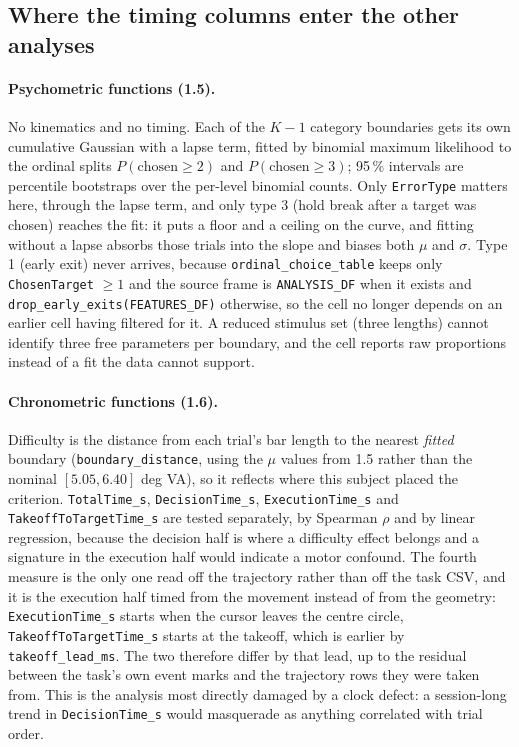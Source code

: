 \documentclass[11pt,a4paper]{article}
\newcommand{\code}[1]{\texttt{\small #1}}
\begin{document}
\subsection{Where the timing columns enter the other analyses}
\label{sec:timingcols}

\paragraph{Psychometric functions (1.5).} No kinematics and no timing. Each of
the $K-1$ category boundaries gets its own cumulative Gaussian with a lapse
term, fitted by binomial maximum likelihood to the ordinal splits
$P(\text{chosen} \ge 2)$ and $P(\text{chosen} \ge 3)$; 95\,\% intervals are
percentile bootstraps over the per-level binomial counts. Only
\code{ErrorType} matters here, through the lapse term, and only type 3 (hold
break after a target was chosen) reaches the fit: it puts a floor and a ceiling
on the curve, and fitting without a lapse absorbs those trials into the slope
and biases both $\mu$ and $\sigma$. Type 1 (early exit) never arrives, because
\code{ordinal\_choice\_table} keeps only \code{ChosenTarget} $\ge 1$ and the
source frame is \code{ANALYSIS\_DF} when it exists and
\code{drop\_early\_exits(FEATURES\_DF)} otherwise, so the cell no longer depends
on an earlier cell having filtered for it. A reduced stimulus set (three lengths)
cannot identify three free parameters per boundary, and the cell reports raw
proportions instead of a fit the data cannot support.

\paragraph{Chronometric functions (1.6).} Difficulty is the distance from each
trial's bar length to the nearest \emph{fitted} boundary
(\code{boundary\_distance}, using the $\mu$ values from 1.5 rather than the
nominal $[5.05, 6.40]$ deg VA), so it reflects where this subject placed the
criterion. \code{TotalTime\_s}, \code{DecisionTime\_s},
\code{ExecutionTime\_s} and \code{TakeoffToTargetTime\_s} are tested separately,
by Spearman $\rho$ and by linear regression, because the decision half is where
a difficulty effect belongs and a signature in the execution half would indicate
a motor confound. The fourth measure is the only one read off the trajectory
rather than off the task CSV, and it is the execution half timed from the
movement instead of from the geometry: \code{ExecutionTime\_s} starts when the
cursor leaves the centre circle, \code{TakeoffToTargetTime\_s} starts at the
takeoff, which is earlier by \code{takeoff\_lead\_ms}. The two therefore differ
by that lead, up to the residual between the task's own event marks and the
trajectory rows they were taken from. This is the
analysis most directly damaged by a clock defect: a session-long trend in
\code{DecisionTime\_s} would masquerade as anything correlated with trial order.
\end{document}
